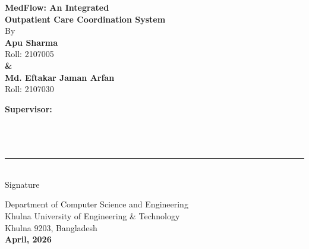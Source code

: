 \documentclass[12pt,a4paper]{report}
\begin{document}
\begin{center}
{\fontsize{18}{27}\bfseries\selectfont
MedFlow: An Integrated\\
Outpatient Care Coordination System}\\[36pt]

{\fontsize{12}{18}\selectfont By}\\[24pt]

{\fontsize{12}{18}\bfseries\selectfont Apu Sharma}\\
{\fontsize{12}{18}\selectfont Roll: 2107005}\\[18pt]
{\fontsize{12}{18}\bfseries\selectfont \&}\\[18pt]
{\fontsize{12}{18}\bfseries\selectfont Md. Eftakar Jaman Arfan}\\
{\fontsize{12}{18}\selectfont Roll: 2107030}
\end{center}

\vspace{48pt}

\noindent
\begin{minipage}[t]{0.62\textwidth}
{\fontsize{12}{18}\bfseries Supervisor:}\\[4pt]
\\
\\
\\
\end{minipage}\hfill
\begin{minipage}[t]{0.26\textwidth}
\vspace{70pt}
\centering
\rule{2in}{0.4pt}\\
{\fontsize{12}{18}\selectfont Signature}
\end{minipage}

\vspace{\fill}

\begin{center}
{\fontsize{12}{18}\selectfont
Department of Computer Science and Engineering\\
Khulna University of Engineering \& Technology\\
Khulna 9203, Bangladesh}\\[6pt]
{\fontsize{16}{24}\bfseries\selectfont April, 2026}
\end{center}
\clearpage
\end{document}
